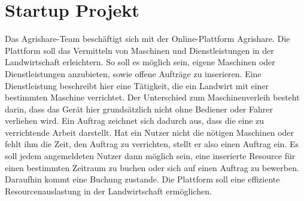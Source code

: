 \section{Startup Projekt}
Das Agrishare-Team beschäftigt sich mit der Online-Plattform Agrishare. Die Plattform soll das Vermitteln von Maschinen und Dienstleistungen in der Landwirtschaft erleichtern. So soll es möglich sein, eigene Maschinen oder Dienstleistungen anzubieten, sowie offene Aufträge zu inserieren. Eine Dienstleistung beschreibt hier eine Tätigkeit, die ein Landwirt mit einer bestimmten Maschine verrichtet. Der Unterschied zum Maschinenverleih besteht darin, dass das Gerät hier grundsätzlich nicht ohne Bediener oder Fahrer verliehen wird. Ein Auftrag zeichnet sich dadurch aus, dass die eine zu verrichtende Arbeit darstellt. Hat ein Nutzer nicht die nötigen Maschinen oder fehlt ihm die Zeit, den Auftrag zu verrichten, stellt er also einen Auftrag ein. Es soll jedem angemeldeten Nutzer dann möglich sein, eine inserierte Resource für einen bestimmten Zeitraum zu buchen oder sich auf einen Auftrag zu bewerben. Daraufhin kommt eine Buchung zustande. Die Plattform soll eine effiziente Resourcenauslastung in der Landwirtschaft ermöglichen.
